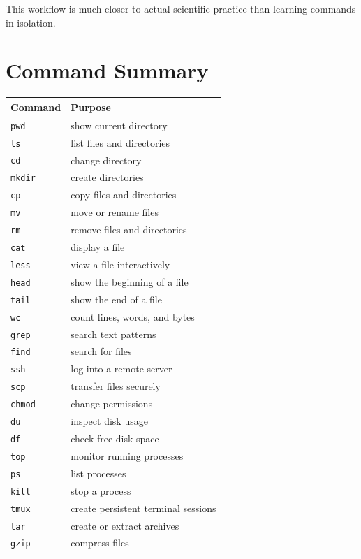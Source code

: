 This workflow is much closer to actual scientific practice than learning
commands in isolation.

\section{Command Summary}

\begin{center}
\begin{tabular}{ll}
\textbf{Command} & \textbf{Purpose} \\
\hline
\texttt{pwd}   & show current directory \\
\texttt{ls}    & list files and directories \\
\texttt{cd}    & change directory \\
\texttt{mkdir} & create directories \\
\texttt{cp}    & copy files and directories \\
\texttt{mv}    & move or rename files \\
\texttt{rm}    & remove files and directories \\
\texttt{cat}   & display a file \\
\texttt{less}  & view a file interactively \\
\texttt{head}  & show the beginning of a file \\
\texttt{tail}  & show the end of a file \\
\texttt{wc}    & count lines, words, and bytes \\
\texttt{grep}  & search text patterns \\
\texttt{find}  & search for files \\
\texttt{ssh}   & log into a remote server \\
\texttt{scp}   & transfer files securely \\
\texttt{chmod} & change permissions \\
\texttt{du}    & inspect disk usage \\
\texttt{df}    & check free disk space \\
\texttt{top}   & monitor running processes \\
\texttt{ps}    & list processes \\
\texttt{kill}  & stop a process \\
\texttt{tmux}  & create persistent terminal sessions \\
\texttt{tar}   & create or extract archives \\
\texttt{gzip}  & compress files \\
\end{tabular}
\end{center}

